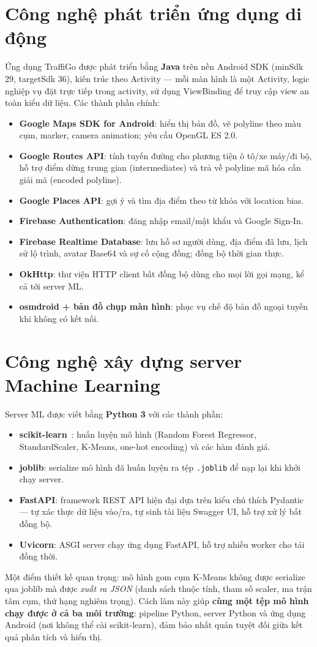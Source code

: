 \section{Công nghệ phát triển ứng dụng di động}
Ứng dụng TraffiGo được phát triển bằng \textbf{Java} trên nền Android SDK (minSdk 29, targetSdk 36), kiến trúc theo Activity --- mỗi màn hình là một Activity, logic nghiệp vụ đặt trực tiếp trong activity, sử dụng ViewBinding để truy cập view an toàn kiểu dữ liệu. Các thành phần chính:
\begin{itemize}[nosep]
 \item \textbf{Google Maps SDK for Android}: hiển thị bản đồ, vẽ polyline theo màu cụm, marker, camera animation; yêu cầu OpenGL ES 2.0.
 \item \textbf{Google Routes API}: tính tuyến đường cho phương tiện ô tô/xe máy/đi bộ, hỗ trợ điểm dừng trung gian (intermediates) và trả về polyline mã hóa cần giải mã (encoded polyline).
 \item \textbf{Google Places API}: gợi ý và tìm địa điểm theo từ khóa với location bias.
 \item \textbf{Firebase Authentication}: đăng nhập email/mật khẩu và Google Sign-In.
 \item \textbf{Firebase Realtime Database}: lưu hồ sơ người dùng, địa điểm đã lưu, lịch sử lộ trình, avatar Base64 và sự cố cộng đồng; đồng bộ thời gian thực.
 \item \textbf{OkHttp}: thư viện HTTP client bất đồng bộ dùng cho mọi lời gọi mạng, kể cả tới server ML.
 \item \textbf{osmdroid + bản đồ chụp màn hình}: phục vụ chế độ bản đồ ngoại tuyến khi không có kết nối.
\end{itemize}

\section{Công nghệ xây dựng server Machine Learning}
Server ML được viết bằng \textbf{Python 3} với các thành phần:
\begin{itemize}[nosep]
 \item \textbf{scikit-learn}~\cite{sklearn}: huấn luyện mô hình (Random Forest Regressor, StandardScaler, K-Means, one-hot encoding) và các hàm đánh giá.
 \item \textbf{joblib}: serialize mô hình đã huấn luyện ra tệp \texttt{.joblib} để nạp lại khi khởi chạy server.
 \item \textbf{FastAPI}: framework REST API hiện đại dựa trên kiểu chú thích Pydantic --- tự xác thực dữ liệu vào/ra, tự sinh tài liệu Swagger UI, hỗ trợ xử lý bất đồng bộ.
 \item \textbf{Uvicorn}: ASGI server chạy ứng dụng FastAPI, hỗ trợ nhiều worker cho tải đồng thời.
\end{itemize}
Một điểm thiết kế quan trọng: mô hình gom cụm K-Means không được serialize qua joblib mà được \textit{xuất ra JSON} (danh sách thuộc tính, tham số scaler, ma trận tâm cụm, thứ hạng nghiêm trọng). Cách làm này giúp \textbf{cùng một tệp mô hình chạy được ở cả ba môi trường}: pipeline Python, server Python và ứng dụng Android (nơi không thể cài scikit-learn), đảm bảo nhất quán tuyệt đối giữa kết quả phân tích và hiển thị.

